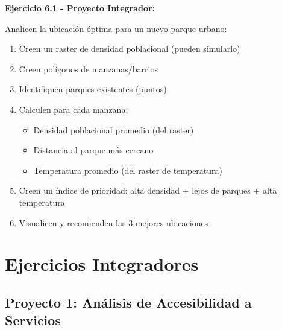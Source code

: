 \documentclass[11pt,a4paper]{article}
\newcommand{\ejercicio}[1]{\begin{tcolorbox}[colback=red!5,colframe=red,title={Ejercicio}]#1\end{tcolorbox}}
\begin{document}
\ejercicio{
\textbf{Ejercicio 6.1 - Proyecto Integrador:}

Analicen la ubicación óptima para un nuevo parque urbano:

\begin{enumerate}
    \item Creen un raster de densidad poblacional (pueden simularlo)
    \item Creen polígonos de manzanas/barrios
    \item Identifiquen parques existentes (puntos)
    \item Calculen para cada manzana:
    \begin{itemize}
        \item Densidad poblacional promedio (del raster)
        \item Distancia al parque más cercano
        \item Temperatura promedio (del raster de temperatura)
    \end{itemize}
    \item Creen un índice de prioridad: alta densidad + lejos de parques + alta temperatura
    \item Visualicen y recomienden las 3 mejores ubicaciones
\end{enumerate}
}

\newpage

\section{Ejercicios Integradores}

\subsection{Proyecto 1: Análisis de Accesibilidad a Servicios}
\end{document}
